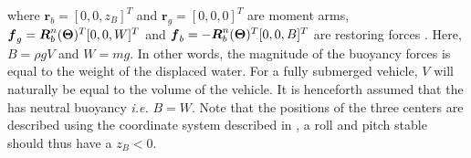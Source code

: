 where $\boldsymbol{r}_b = [0, 0, z_B]^T$ and $\boldsymbol{r}_g = [0, 0, 0]^T$ are moment arms, $\boldsymbol{f}_g = \boldsymbol{R}^n_b(\boldsymbol{\Theta})^T [0, 0, W]^T$ and $\boldsymbol{f}_b = -\boldsymbol{R}^n_b(\boldsymbol{\Theta})^T [0, 0, B]^T$ are restoring forces \citep[p. 60]{fossen2011}.
Here, $B = \rho g V$ and $W = m g$. In other words, the magnitude of the buoyancy forces is equal to the weight of the displaced water. For a fully submerged vehicle, $V$ will naturally be equal to the volume of the vehicle. It is henceforth assumed that the \abbrROV has neutral buoyancy \emph{i.e.} $B = W$. Note that the positions of the three centers are described using the coordinate system described in , a roll and pitch stable \abbrROV should thus have a $z_B < 0$.

